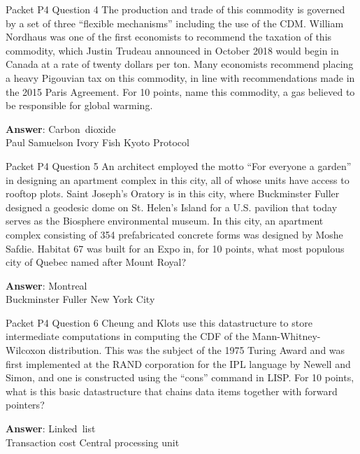 \begin{frame}{Packet P4 Question 4}
The production and trade of this commodity is governed by a set of three “flexible mechanisms” including the use of the CDM. William Nordhaus   was one of the first economists to recommend the taxation of this commodity, which Justin Trudeau announced in October 2018 would begin in Canada at a rate of twenty dollars per ton. Many economists recommend placing a heavy Pigouvian tax on   this commodity, in line with recommendations made in the 2015 Paris Agreement. For 10 points, name this commodity, a gas believed to be responsible for global warming.    

\textbf{Answer}: Carbon\ dioxide\\
 Paul Samuelson
 Ivory
 Fish
 Kyoto Protocol
\end{frame}

\begin{frame}{Packet P4 Question 5}
An architect employed the motto “For everyone a garden” in designing an apartment complex in this city, all of whose units have access to rooftop plots. Saint Joseph’s Oratory is in this city, where Buckminster   Fuller designed a geodesic dome on St. Helen’s Island for a U.S. pavilion that today serves as the Biosphere environmental   museum. In this city, an apartment complex consisting of 354 prefabricated concrete forms was designed by Moshe Safdie. Habitat   67 was built for an Expo in, for 10 points, what most populous city of Quebec named   after Mount Royal?  

\textbf{Answer}: Montreal\\
 Buckminster Fuller
 New York City
\end{frame}

\begin{frame}{Packet P4 Question 6}
Cheung and Klots use this   datastructure to store intermediate computations in computing the CDF of the Mann-Whitney-Wilcoxon   distribution.  This was the subject of the 1975 Turing Award and was first implemented at the RAND   corporation for the IPL language by Newell and Simon, and one is constructed using the ``cons'' command     in LISP.  For 10 points, what is this basic datastructure that chains data items   together with forward pointers?

\textbf{Answer}: Linked\ list\\
 Transaction cost
 Central processing unit
\end{frame}

